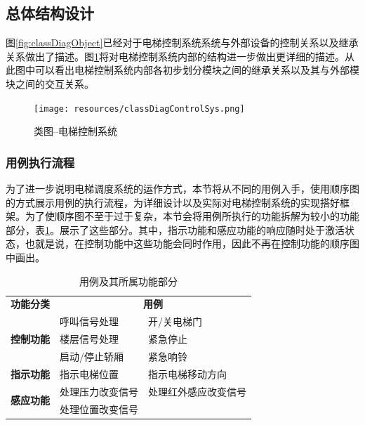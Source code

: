 \begin{minipage}{\textwidth}
\subsection{总体结构设计}
\label{sec:overallStructure}
图\ref{fig:classDiagObject}已经对于电梯控制系统系统与外部设备的控制关系以及继承关系做出了描述。图\ref{fig:classDiagControlSys}将对电梯控制系统内部的结构进一步做出更详细的描述。从此图中可以看出电梯控制系统内部各初步划分模块之间的继承关系以及其与外部模块之间的交互关系。

\begin{figure}[H]
	\centering
	\texttt{[image: resources/classDiagControlSys.png]}
	\caption{类图--电梯控制系统}
	\label{fig:classDiagControlSys}
\end{figure}
\end{minipage}

\subsubsection{用例执行流程}
为了进一步说明电梯调度系统的运作方式，本节将从不同的用例入手，使用顺序图的方式展示用例的执行流程，为详细设计以及实际对电梯控制系统的实现搭好框架。为了使顺序图不至于过于复杂，本节会将用例所执行的功能拆解为较小的功能部分，表\ref{tab:seqDiagTab}。展示了这些部分。其中，指示功能和感应功能的响应随时处于激活状态，也就是说，在控制功能中这些功能会同时作用，因此不再在控制功能的顺序图中画出。
\begin{table}[H]
	\centering
	\caption{用例及其所属功能部分}
	\label{tab:seqDiagTab}
	\begin{tabular}{c l l}
		\toprule
		\multicolumn{1}{c}{\textbf{功能分类}} &
		\multicolumn{2}{c}{\textbf{用例}} \\
		\cmidrule(lr){1-1} \cmidrule(lr){2-3}

		\multirow{3}{*}{\textbf{控制功能}}
		& 呼叫信号处理   & 开/关电梯门 \\
		& 楼层信号处理   & 紧急停止 \\
		& 启动/停止轿厢  & 紧急响铃 \\
		\cmidrule(lr){1-3}
		\multirow{1}{*}{\textbf{指示功能}}
		& 指示电梯位置 & 指示电梯移动方向 \\
		\cmidrule(lr){1-3}
		\multirow{2}{*}{\textbf{感应功能}}
		& 处理压力改变信号 & 处理红外感应改变信号 \\
		& 处理位置改变信号 \\
		\bottomrule
	\end{tabular}
\end{table}

